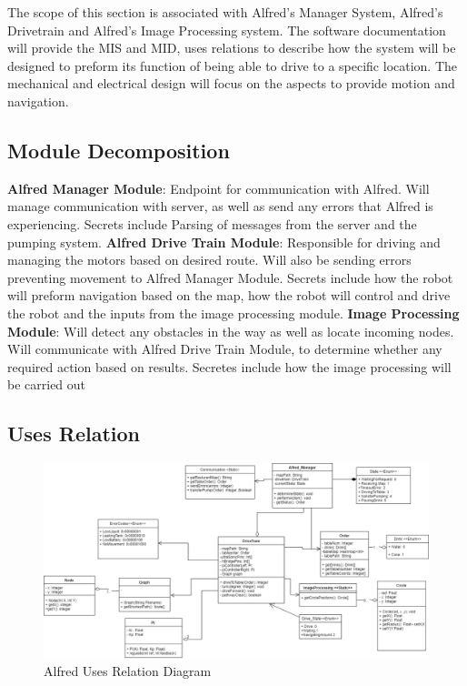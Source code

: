 \documentclass [10pt]{article}
\begin{document}
The scope of this section is associated with Alfred's Manager System, Alfred's Drivetrain and Alfred's Image Processing system. The software documentation will provide the MIS and MID, uses relations to describe how the system will be designed to preform its function of being able to drive to a specific location. The mechanical and electrical design will focus on the aspects to provide motion and navigation.


\subsection{Module Decomposition}

\textbf{Alfred Manager Module}: Endpoint for communication with Alfred. Will manage communication with server, as well as send any errors that Alfred is experiencing. Secrets include Parsing of messages from the server and the pumping system. 
\textbf{Alfred Drive Train Module}: Responsible for driving and managing the motors based on desired route. Will also be sending errors preventing movement to Alfred Manager Module. Secrets include how the robot will preform navigation based on the map, how the robot will control and drive the robot and the inputs from the image processing module.
\textbf{Image Processing Module}: Will detect any obstacles in the way as well as locate incoming nodes. Will communicate with Alfred Drive Train Module, to determine whether any required action based on results. Secretes include how the image processing will be carried out

\subsection{Uses Relation}
\begin{figure} [h!]
	\centering
	\includegraphics [scale = 0.4] {figures/Alfred_UsesDiagram.png}
	\caption{Alfred Uses Relation Diagram}
\end{figure}
\end{document}
